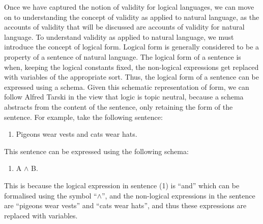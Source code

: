 Once we have captured the notion of validity for logical languages, we
can move on to understanding the concept of validity as applied to
natural language, as the accounts of validity that will be discussed are
accounts of validity for natural language. To understand validity as
applied to natural language, we must introduce the concept of logical
form. Logical form is generally considered to be a property of a
sentence of natural language. The logical form of a sentence is when,
keeping the logical constants fixed, the non-logical expressions get
replaced with variables of the appropriate sort. Thus, the logical form
of a sentence can be expressed using a schema. Given this schematic
representation of form, we can follow Alfred Tarski in the view that
logic is topic neutral, because a schema abstracts from the content of
the sentence, only retaining the form of the sentence. For example, take
the following sentence:

\begin{enumerate}[leftmargin=42pt] 
\def\labelenumi{(\arabic{enumi})}
\item
  Pigeons wear vests and cats wear hats.
\end{enumerate}

\noindent This sentence can be expressed using the following schema:

\begin{enumerate}[leftmargin=42pt] 
\def\labelenumi{(\arabic{enumi})}
\setcounter{enumi}{1}
\item
  A $\land$ B.
\end{enumerate}

\noindent This is because the logical expression in sentence (1) is ``and'' which
can be formalised using the symbol ``$\land$'', and the non-logical
expressions in the sentence are ``pigeons wear vests'' and ``cats wear
hats'', and thus these expressions are replaced with variables.

